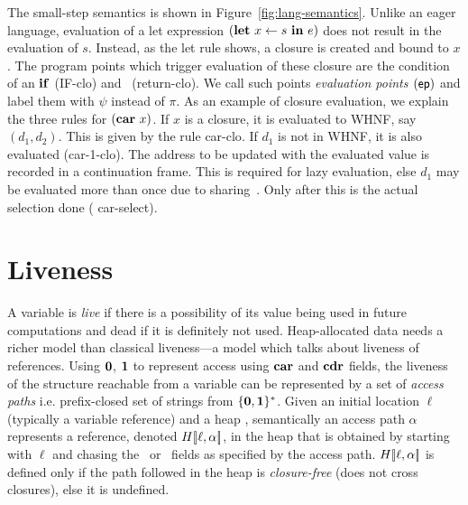 \documentclass[preprint,9pt]{sigplanconf}
\newcommand{\comment}[1]{{\color{Myblue}{#1}}}
\newcommand{\oxlb}{\ensuremath{[\!|}}
\newcommand{\oxrb}{\ensuremath{|\!]}}
\begin{document}
The small-step semantics  is shown in Figure~\ref{fig:lang-semantics}.
Unlike   an   eager  language,   evaluation   of   a  let   expression
$(\mbox{$\mathbf{ let}$}~x\leftarrow  s~\mbox{$\mathbf{ in}$}~e)$ does  not  result in  the evaluation  of
$s$. Instead,  as the {\sc let}  rule shows, a closure  is created and
bound to  $x$. The  program points which  trigger evaluation  of these
closure   are  the   condition  of   an  $\mbox{$\mathbf{ if}$}$   ({\sc  IF-clo})   and
\SRETURN\ ({\sc  return-clo}).  We  call such  points \emph{evaluation
  points   $(\mathsf{ep})$}  and   label  them   with  $\psi$   instead  of
$\pi$. As an  example of closure  evaluation, we  explain the
three rules for  $(\mbox{$\mathbf{car}$}~x)$.  If $x$ is a closure,  it is evaluated to
WHNF, say $(d_1, d_2)$.  This is  given by the rule {\sc car-clo}.  If
$d_1$ is  not in WHNF,  it is  also evaluated ({\sc  car-1-clo}).  The
address  to be  updated  with the  evaluated value  is
recorded  in  a  continuation  frame.    This  is  required  for  lazy
evaluation, else $d_1$ may  be evaluated more than once
due to  sharing~\cite{Jones87}.  Only after this  is the actual selection  done ({\sc
  car-select}).


\renewcommand{\pp}[2]{\ensuremath{#1\!\!:\!#2}} %



\section{Liveness}
\label{sec:liveness}

A variable is {\em live} if there  is a possibility of its value being
used in  future computations and  dead if  it is definitely  not used.
Heap-allocated data  needs a richer model  than classical liveness---a
model  which  talks  about  liveness of  references.   Using  $\mathbf{0}$,
$\mathbf{1}$  to  represent access  using  $\mbox{$\mathbf{car}$}$  and $\mbox{$\mathbf{cdr}$}$  fields,  the
liveness of the structure reachable from a variable can be represented
by a set of {\em access paths} i.e.  prefix-closed set of strings from
$\{\mathbf{0},\mathbf{1}\}^\ast$.  Given an initial location $\ell$ (typically a
variable  reference) and  a heap  \heap, semantically  an access  path
$\alpha$ represents  a reference, denoted $\heap\oxlb\ell,  \alpha\oxrb$, in
the heap  that is  obtained by  starting with  $\ell$ and  chasing the
\CAR\ or  \CDR\ fields  as specified  by the  access path.  
$\heap\oxlb\ell, \alpha\oxrb$  is defined only  if the path followed  in the
heap  is \emph{closure-free}  (does not  cross closures),  else it  is
undefined.
\end{document}
